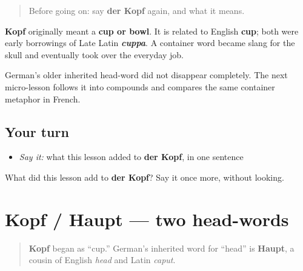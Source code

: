 \begin{quote}
Before going on: say \textbf{der Kopf} again, and what it means.
\end{quote}

\begin{cousinweb}
\textbf{Kopf} originally meant a \textbf{cup or bowl}. It is related to English \textbf{cup}; both were early borrowings of Late Latin \emph{\textbf{cuppa}}. A container word became slang for the skull and eventually took over the everyday job.

German’s older inherited head-word did not disappear completely. The next micro-lesson follows it into compounds and compares the same container metaphor in French.
\end{cousinweb}

\subsection*{Your turn}
\begin{itemize}
\raggedright
  \item \emph{Say it:} what this lesson added to \textbf{der Kopf}, in one sentence
\end{itemize}

\begin{tcolorbox}[breakable,colback=teal!4,colframe=teal!35!black,title={Before you move on}]
What did this lesson add to \textbf{der Kopf}? Say it once more, without looking.
\end{tcolorbox}
\section[Kopf / Haupt]{Kopf / Haupt — two head-words}

\label{lesson:GE-C17-kopf-haupt}



\begin{quote}
\textbf{Kopf} began as “cup.” German’s inherited word for “head” is \textbf{Haupt}, a cousin of English \emph{head} and Latin \emph{caput}.
\end{quote}

